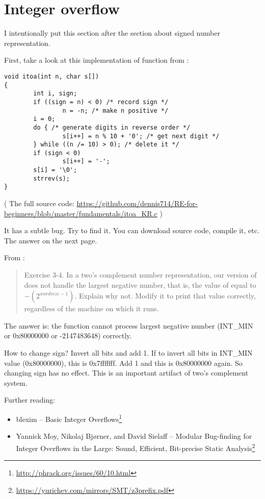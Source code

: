 \section{Integer overflow}

I intentionally put this section after the section about signed number representation.

First, take a look at this implementation of  function from \InSqBrackets{\KRBook}:

\begin{lstlisting}[style=customc]
void itoa(int n, char s[])
{
        int i, sign;
        if ((sign = n) < 0) /* record sign */
                n = -n; /* make n positive */
        i = 0;
        do { /* generate digits in reverse order */
                s[i++] = n % 10 + '0'; /* get next digit */
        } while ((n /= 10) > 0); /* delete it */
        if (sign < 0)
                s[i++] = '-';
        s[i] = '\0';
        strrev(s);
}
\end{lstlisting}

( The full source code: \url{https://github.com/dennis714/RE-for-beginners/blob/master/fundamentals/itoa_KR.c} )

It has a subtle bug. Try to find it. You can download source code, compile it, etc.
The answer on the next page.

\clearpage

From \InSqBrackets{\KRBook}:

\begin{framed}
\begin{quotation}
Exercise 3-4. In a two's complement number representation, our version of 
does not handle the largest negative number, that is, the value
of  equal to $-(2^{wordsize-1})$. Explain why not. Modify it to
print that value correctly, regardless of the machine on which
it runs.
\end{quotation}
\end{framed}

The answer is: the function cannot process largest negative number (INT\_MIN or 0x80000000 or -2147483648) correctly.

How to change sign? Invert all bits and add 1.
If to invert all bits in INT\_MIN value (0x80000000), this is 0x7fffffff. Add 1 and this is 0x80000000 again.
So changing sign has no effect.
This is an important artifact of two's complement system.

Further reading:

\begin{itemize}
\item blexim -- Basic Integer Overflows\footnote{\url{http://phrack.org/issues/60/10.html}}

\item Yannick Moy, Nikolaj Bjørner, and David Sielaff -- Modular Bug-finding for Integer Overflows in the Large: Sound, Efficient, Bit-precise Static Analysis\footnote{\url{https://yurichev.com/mirrors/SMT/z3prefix.pdf}}
\end{itemize}

